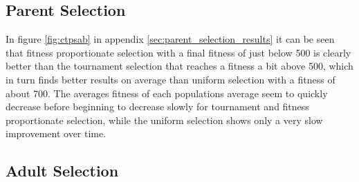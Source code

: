 
\subsection{Parent Selection} %
\label{sub:parent_selection}

In figure \ref{fig:ctpsab} in appendix \ref{sec:parent_selection_results} it can be seen that fitness proportionate selection with a final fitness of just below 500 is clearly better than the tournament selection that reaches a fitness a bit above 500, which in turn finds better results on average than uniform selection with a fitness of about 700. The averages fitness of each populations average seem to quickly decrease before beginning to decrease slowly for tournament and fitness proportionate selection, while the uniform selection shows only a very slow improvement over time.





\subsection{Adult Selection} %
\label{sub:adult_selection}


